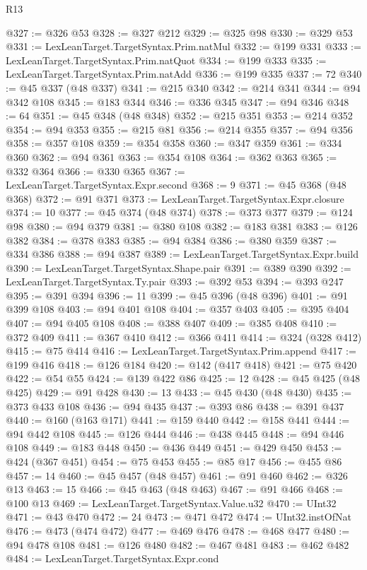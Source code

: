 \begin{lexlean}{R13}
\begin{coremodule}
@327 := @326 @53
@328 := @327 @212
@329 := @325 @98
@330 := @329 @53
@331 := LexLeanTarget.TargetSyntax.Prim.natMul
@332 := @199 @331
@333 := LexLeanTarget.TargetSyntax.Prim.natQuot
@334 := @199 @333
@335 := LexLeanTarget.TargetSyntax.Prim.natAdd
@336 := @199 @335
@337 := 72
@340 := @45 @337 (@48 @337)
@341 := @215 @340
@342 := @214 @341
@344 := @94 @342 @108
@345 := @183 @344
@346 := @336 @345
@347 := @94 @346
@348 := 64
@351 := @45 @348 (@48 @348)
@352 := @215 @351
@353 := @214 @352
@354 := @94 @353
@355 := @215 @81
@356 := @214 @355
@357 := @94 @356
@358 := @357 @108
@359 := @354 @358
@360 := @347 @359
@361 := @334 @360
@362 := @94 @361
@363 := @354 @108
@364 := @362 @363
@365 := @332 @364
@366 := @330 @365
@367 := LexLeanTarget.TargetSyntax.Expr.second
@368 := 9
@371 := @45 @368 (@48 @368)
@372 := @91 @371
@373 := LexLeanTarget.TargetSyntax.Expr.closure
@374 := 10
@377 := @45 @374 (@48 @374)
@378 := @373 @377
@379 := @124 @98
@380 := @94 @379
@381 := @380 @108
@382 := @183 @381
@383 := @126 @382
@384 := @378 @383
@385 := @94 @384
@386 := @380 @359
@387 := @334 @386
@388 := @94 @387
@389 := LexLeanTarget.TargetSyntax.Expr.build
@390 := LexLeanTarget.TargetSyntax.Shape.pair
@391 := @389 @390
@392 := LexLeanTarget.TargetSyntax.Ty.pair
@393 := @392 @53
@394 := @393 @247
@395 := @391 @394
@396 := 11
@399 := @45 @396 (@48 @396)
@401 := @91 @399 @108
@403 := @94 @401 @108
@404 := @357 @403
@405 := @395 @404
@407 := @94 @405 @108
@408 := @388 @407
@409 := @385 @408
@410 := @372 @409
@411 := @367 @410
@412 := @366 @411
@414 := @324 (@328 @412)
@415 := @75 @414
@416 := LexLeanTarget.TargetSyntax.Prim.append
@417 := @199 @416
@418 := @126 @184
@420 := @142 (@417 @418)
@421 := @75 @420
@422 := @54 @55
@424 := @139 @422 @86
@425 := 12
@428 := @45 @425 (@48 @425)
@429 := @91 @428
@430 := 13
@433 := @45 @430 (@48 @430)
@435 := @373 @433 @108
@436 := @94 @435
@437 := @393 @86
@438 := @391 @437
@440 := @160 (@163 @171)
@441 := @159 @440
@442 := @158 @441
@444 := @94 @442 @108
@445 := @126 @444
@446 := @438 @445
@448 := @94 @446 @108
@449 := @183 @448
@450 := @436 @449
@451 := @429 @450
@453 := @424 (@367 @451)
@454 := @75 @453
@455 := @85 @17
@456 := @455 @86
@457 := 14
@460 := @45 @457 (@48 @457)
@461 := @91 @460
@462 := @326 @13
@463 := 15
@466 := @45 @463 (@48 @463)
@467 := @91 @466
@468 := @100 @13
@469 := LexLeanTarget.TargetSyntax.Value.u32
@470 := UInt32
@471 := @43 @470
@472 := 24
@473 := @471 @472
@474 := UInt32.instOfNat
@476 := @473 (@474 @472)
@477 := @469 @476
@478 := @468 @477
@480 := @94 @478 @108
@481 := @126 @480
@482 := @467 @481
@483 := @462 @482
@484 := LexLeanTarget.TargetSyntax.Expr.cond

\end{coremodule}
\end{lexlean}
